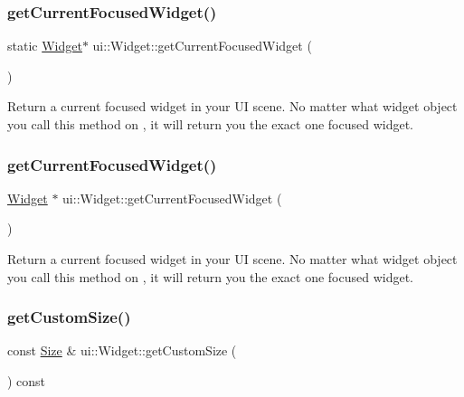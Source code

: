 \subsubsection{\texorpdfstring{get\+Current\+Focused\+Widget()}{getCurrentFocusedWidget()}\hspace{0.1cm}{\footnotesize\ttfamily [3/4]}}
{\footnotesize\ttfamily static \hyperlink{classui_1_1Widget}{Widget}$\ast$ ui\+::\+Widget\+::get\+Current\+Focused\+Widget (\begin{DoxyParamCaption}{ }\end{DoxyParamCaption})\hspace{0.3cm}{\ttfamily [static]}}

Return a current focused widget in your UI scene. No matter what widget object you call this method on , it will return you the exact one focused widget. \mbox{\label{classui_1_1Widget_ad8525b896c511dee435bdc4251ed6964}} 
\subsubsection{\texorpdfstring{get\+Current\+Focused\+Widget()}{getCurrentFocusedWidget()}\hspace{0.1cm}{\footnotesize\ttfamily [4/4]}}
{\footnotesize\ttfamily \hyperlink{classui_1_1Widget}{Widget} $\ast$ ui\+::\+Widget\+::get\+Current\+Focused\+Widget (\begin{DoxyParamCaption}{ }\end{DoxyParamCaption})\hspace{0.3cm}{\ttfamily [static]}}

Return a current focused widget in your UI scene. No matter what widget object you call this method on , it will return you the exact one focused widget. \mbox{\label{classui_1_1Widget_ade1b14056d19b18729a41efb43964ab3}} 
\subsubsection{\texorpdfstring{get\+Custom\+Size()}{getCustomSize()}\hspace{0.1cm}{\footnotesize\ttfamily [1/2]}}
{\footnotesize\ttfamily const \hyperlink{classSize}{Size} \& ui\+::\+Widget\+::get\+Custom\+Size (\begin{DoxyParamCaption}{ }\end{DoxyParamCaption}) const}

